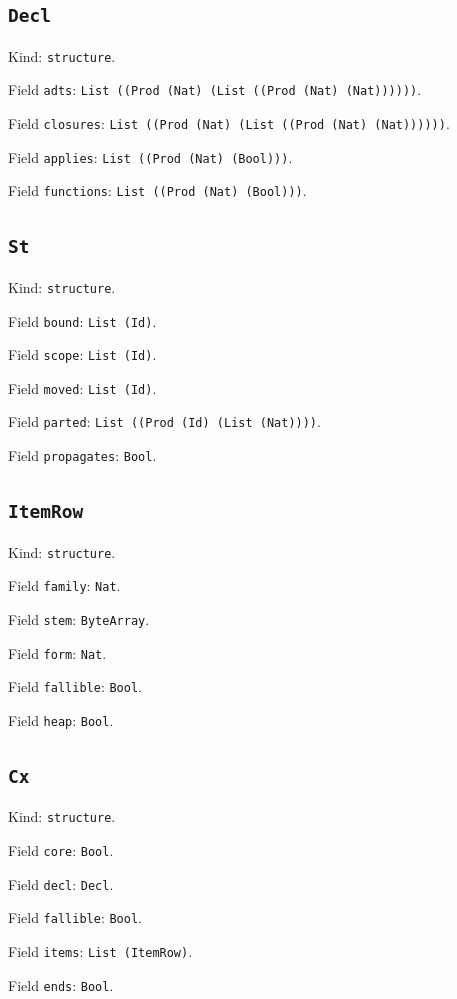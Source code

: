 \documentclass[11pt]{article}
\begin{document}
\subsection*{\texttt{Decl}}
\noindent Kind: \texttt{structure}.\par
\noindent Field \texttt{adts}: \texttt{List ((Prod (Nat) (List ((Prod (Nat) (Nat))))))}.\par
\noindent Field \texttt{closures}: \texttt{List ((Prod (Nat) (List ((Prod (Nat) (Nat))))))}.\par
\noindent Field \texttt{applies}: \texttt{List ((Prod (Nat) (Bool)))}.\par
\noindent Field \texttt{functions}: \texttt{List ((Prod (Nat) (Bool)))}.\par
\subsection*{\texttt{St}}
\noindent Kind: \texttt{structure}.\par
\noindent Field \texttt{bound}: \texttt{List (Id)}.\par
\noindent Field \texttt{scope}: \texttt{List (Id)}.\par
\noindent Field \texttt{moved}: \texttt{List (Id)}.\par
\noindent Field \texttt{parted}: \texttt{List ((Prod (Id) (List (Nat))))}.\par
\noindent Field \texttt{propagates}: \texttt{Bool}.\par
\subsection*{\texttt{ItemRow}}
\noindent Kind: \texttt{structure}.\par
\noindent Field \texttt{family}: \texttt{Nat}.\par
\noindent Field \texttt{stem}: \texttt{ByteArray}.\par
\noindent Field \texttt{form}: \texttt{Nat}.\par
\noindent Field \texttt{fallible}: \texttt{Bool}.\par
\noindent Field \texttt{heap}: \texttt{Bool}.\par
\subsection*{\texttt{Cx}}
\noindent Kind: \texttt{structure}.\par
\noindent Field \texttt{core}: \texttt{Bool}.\par
\noindent Field \texttt{decl}: \texttt{Decl}.\par
\noindent Field \texttt{fallible}: \texttt{Bool}.\par
\noindent Field \texttt{items}: \texttt{List (ItemRow)}.\par
\noindent Field \texttt{ends}: \texttt{Bool}.\par
\end{document}
